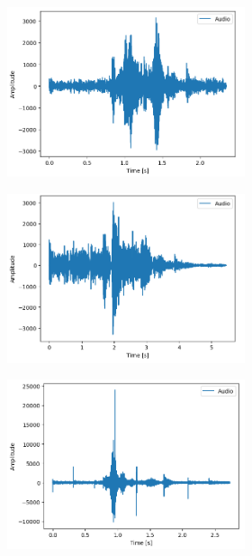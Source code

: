 \documentclass[11pt]{article}
\begin{document}
\begin{figure}
\begin{subfigure}{.5\textwidth}
\begin{subfigure}{.18\textwidth}
  \includegraphics[width=\linewidth]{Bilder/seminat_happy.png}
  \label{fig:sfig2}
\end{subfigure}
\begin{subfigure}{.18\textwidth}
  \centering
  \includegraphics[width=\linewidth]{Bilder/seminat_sad.png}
  \label{fig:sfig2}
\end{subfigure}
\begin{subfigure}{.18\textwidth}
  \centering
  \includegraphics[width=\linewidth]{Bilder/seminat_fear.png}

\end{subfigure}
\end{subfigure}
\end{figure}
\end{document}

